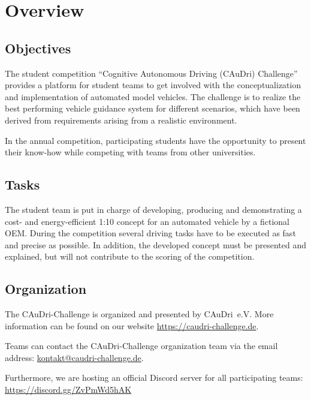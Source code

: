 \chapter{Overview}

\section{Objectives}

The student competition “Cognitive Autonomous Driving (CAuDri) Challenge” provides a platform for student teams to get involved with the conceptualization and implementation of automated model vehicles. 
The challenge is to realize the best performing vehicle guidance system for different scenarios, which have been derived from requirements arising from a realistic environment.

In the annual competition, participating students have the opportunity to present their know-how while competing with teams from other universities.

\section{Tasks}

The student team is put in charge of developing, producing and demonstrating a cost- and energy-efficient 1:10 concept for an automated vehicle by a fictional OEM. 
During the competition several driving tasks have to be executed as fast and precise as possible. 
In addition, the developed concept must be presented and explained, but will not contribute to the scoring of the competition.

\section{Organization}

The CAuDri-Challenge is organized and presented by CAuDri~e.V.
More information can be found on our website \href{https://caudri-challenge.de}{https://caudri-challenge.de}.

Teams can contact the CAuDri-Challenge organization team via the email address:
\newline
\href{mailto:kontakt@caudri-challenge.de}{kontakt@caudri-challenge.de}.

Furthermore, we are hosting an official Discord server for all participating
teams:\newline
\href{https://discord.gg/ZvPmWd5hAK}{https://discord.gg/ZvPmWd5hAK}